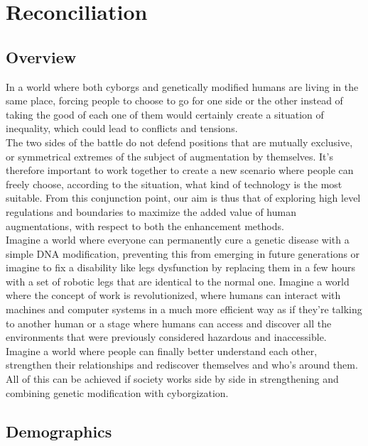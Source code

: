 
\chapter*{Reconciliation}
\label{cha:reconciliation}

\section*{Overview}
\label{sec:overview}

In a world where both cyborgs and genetically modified humans are living in the same place, forcing people to choose to go for one side or the other instead of taking the good of each one of them would certainly create a situation of inequality, which could lead to conflicts and tensions.\\

The two sides of the battle do not defend positions that are mutually exclusive, or symmetrical extremes of the subject of augmentation by themselves. It’s therefore important to work together to create a new scenario where people can freely choose, according to the situation, what kind of technology is the most suitable. From this conjunction point, our aim is thus that of exploring high level regulations and boundaries to maximize the added value of human augmentations, with respect to both the enhancement methods.\\

Imagine a world where everyone can permanently cure a genetic disease with a simple DNA modification, preventing this from emerging in future generations or imagine to fix a disability like legs dysfunction by replacing them in a few hours with a set of robotic legs that are identical to the normal one. Imagine a world where the concept of work is revolutionized, where humans can interact with machines and computer systems in a much more efficient way as if they’re talking to another human or a stage where humans can access and discover all the environments that were previously considered hazardous and inaccessible. Imagine a world where people can finally better understand each other, strengthen their relationships and rediscover themselves and who’s around them.\\

All of this can be achieved if society works side by side in strengthening and combining genetic modification with cyborgization. 

\section*{Demographics}
\label{sec:demographics}

